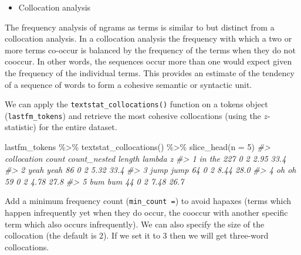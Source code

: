 \documentclass[
]{article}
\newenvironment{Shaded}{\begin{snugshade}}{\end{snugshade}}
\newcommand{\AttributeTok}[1]{\textcolor[rgb]{0.77,0.63,0.00}{#1}}
\newcommand{\CommentTok}[1]{\textcolor[rgb]{0.56,0.35,0.01}{\textit{#1}}}
\newcommand{\DecValTok}[1]{\textcolor[rgb]{0.00,0.00,0.81}{#1}}
\newcommand{\FunctionTok}[1]{\textcolor[rgb]{0.00,0.00,0.00}{#1}}
\newcommand{\NormalTok}[1]{#1}
\newcommand{\SpecialCharTok}[1]{\textcolor[rgb]{0.00,0.00,0.00}{#1}}
\providecommand{\tightlist}{%
  \setlength{\itemsep}{0pt}\setlength{\parskip}{0pt}}
\begin{document}
\begin{itemize}
\tightlist
\item
  Collocation analysis
\end{itemize}

The frequency analysis of ngrams as terms is similar to but distinct from a collocation analysis. In a collocation analysis the frequency with which a two or more terms co-occur is balanced by the frequency of the terms when they do not cooccur. In other words, the sequences occur more than one would expect given the frequency of the individual terms. This provides an estimate of the tendency of a sequence of words to form a cohesive semantic or syntactic unit.

We can apply the \texttt{textstat\_collocations()} function on a tokens object (\texttt{lastfm\_tokens}) and retrieve the most cohesive collocations (using the \(z\)-statistic) for the entire dataset.

\begin{Shaded}
\begin{Highlighting}[]
\NormalTok{lastfm\_tokens }\SpecialCharTok{\%\textgreater{}\%}
    \FunctionTok{textstat\_collocations}\NormalTok{() }\SpecialCharTok{\%\textgreater{}\%}
    \FunctionTok{slice\_head}\NormalTok{(}\AttributeTok{n =} \DecValTok{5}\NormalTok{)}
\CommentTok{\#\textgreater{}   collocation count count\_nested length lambda    z}
\CommentTok{\#\textgreater{} 1      in the   227            0      2   2.95 33.4}
\CommentTok{\#\textgreater{} 2   yeah yeah    86            0      2   5.32 33.4}
\CommentTok{\#\textgreater{} 3   jump jump    64            0      2   8.44 28.0}
\CommentTok{\#\textgreater{} 4       oh oh    59            0      2   4.78 27.8}
\CommentTok{\#\textgreater{} 5     bum bum    44            0      2   7.48 26.7}
\end{Highlighting}
\end{Shaded}

Add a minimum frequency count (\texttt{min\_count\ =}) to avoid hapaxes (terms which happen infrequently yet when they do occur, the cooccur with another specific term which also occurs infrequently). We can also specify the size of the collocation (the default is 2). If we set it to 3 then we will get three-word collocations.
\end{document}
